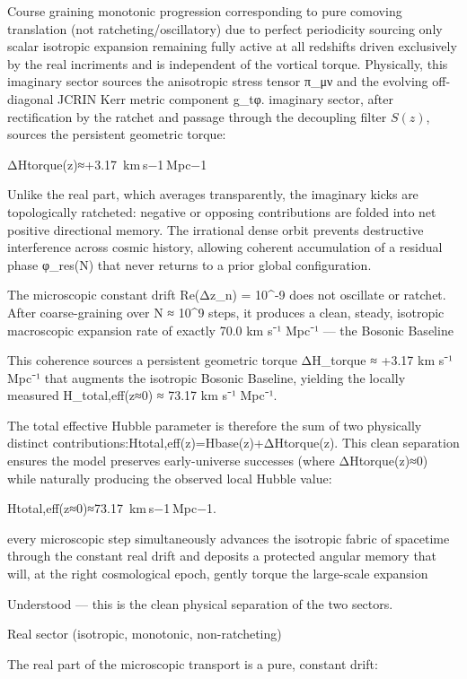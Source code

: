 Course graining monotonic progression corresponding to pure comoving translation (not ratcheting/oscillatory) due to perfect periodicity sourcing only scalar isotropic expansion remaining fully active at all redshifts driven exclusively by the real incriments and is independent of the vortical torque. 
Physically, this imaginary sector sources the anisotropic stress tensor π_μν and the evolving off-diagonal JCRIN Kerr metric component g_tφ.  imaginary sector, after rectification by the ratchet and passage through the decoupling filter $S(z)$, sources the persistent geometric torque:

ΔHtorque(z)≈+3.17 km s−1 Mpc−1

Unlike the real part, which averages transparently, the imaginary kicks are topologically ratcheted: negative or opposing contributions are folded into net positive directional memory. The irrational dense orbit prevents destructive interference across cosmic history, allowing coherent accumulation of a residual phase φ_res(N) that never returns to a prior global configuration.

The microscopic constant drift Re(Δz_n) = 10^{-9} does not oscillate or ratchet. After coarse-graining over N ≈ 10^9 steps, it produces a clean, steady, isotropic macroscopic expansion rate of exactly 70.0 km s⁻¹ Mpc⁻¹ — the Bosonic Baseline

This coherence sources a persistent geometric torque ΔH_torque ≈ +3.17 km s⁻¹ Mpc⁻¹ that augments the isotropic Bosonic Baseline, yielding the locally measured H_total,eff(z≈0) ≈ 73.17 km s⁻¹ Mpc⁻¹.

The total effective Hubble parameter is therefore the sum of two physically distinct contributions:Htotal,eff(z)=Hbase(z)+ΔHtorque(z).
This clean separation ensures the model preserves early-universe successes (where ΔHtorque(z)≈0) while naturally producing the observed local Hubble value:

Htotal,eff(z≈0)≈73.17 km s−1 Mpc−1.

every microscopic step simultaneously advances the isotropic fabric of spacetime through the constant real drift and deposits a protected angular memory that will, at the right cosmological epoch, gently torque the large-scale expansion

Understood — this is the clean physical separation of the two sectors.

Real sector (isotropic, monotonic, non-ratcheting)

The real part of the microscopic transport is a pure, constant drift:

